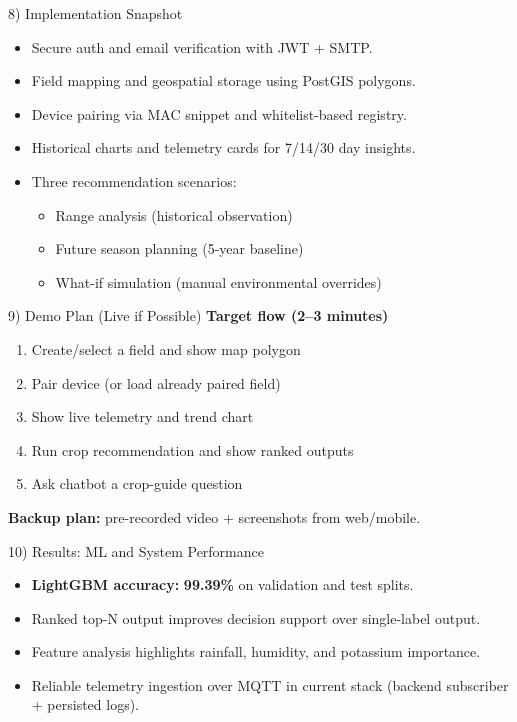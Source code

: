\documentclass[aspectratio=169]{beamer}
\begin{document}
\begin{frame}{8) Implementation Snapshot}
  \begin{itemize}
    \item Secure auth and email verification with JWT + SMTP.
    \item Field mapping and geospatial storage using PostGIS polygons.
    \item Device pairing via MAC snippet and whitelist-based registry.
    \item Historical charts and telemetry cards for 7/14/30 day insights.
    \item Three recommendation scenarios:
    \begin{itemize}
      \item Range analysis (historical observation)
      \item Future season planning (5-year baseline)
      \item What-if simulation (manual environmental overrides)
    \end{itemize}
  \end{itemize}
\end{frame}

\begin{frame}{9) Demo Plan (Live if Possible)}
  \textbf{Target flow (2--3 minutes)}
  \begin{enumerate}
    \item Create/select a field and show map polygon
    \item Pair device (or load already paired field)
    \item Show live telemetry and trend chart
    \item Run crop recommendation and show ranked outputs
    \item Ask chatbot a crop-guide question
  \end{enumerate}
  \vspace{0.5em}
  \textbf{Backup plan:} pre-recorded video + screenshots from web/mobile.
\end{frame}

\begin{frame}{10) Results: ML and System Performance}
  \begin{itemize}
    \item \textbf{LightGBM accuracy:} \textbf{99.39\%} on validation and test splits.
    \item Ranked top-N output improves decision support over single-label output.
    \item Feature analysis highlights rainfall, humidity, and potassium importance.
    \item Reliable telemetry ingestion over MQTT in current stack (backend subscriber + persisted logs).
  \end{itemize}
  \vspace{0.5em}
  \centering
\end{frame}
\end{document}
